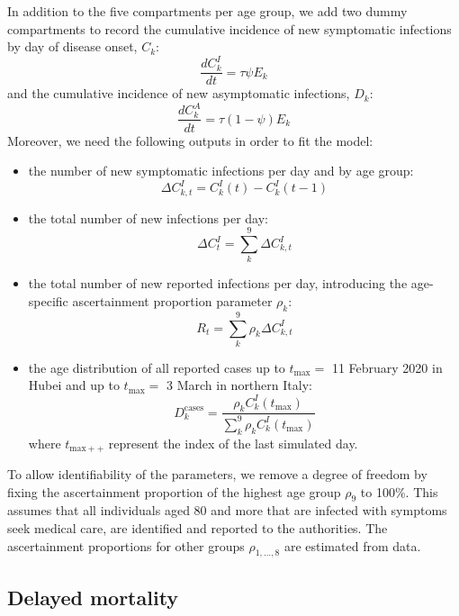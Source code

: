 \documentclass{article}
\begin{document}
	In addition to the five compartments per age group, we add two dummy compartments to record the cumulative incidence of new symptomatic infections by day of disease onset, $C_k$:
	\begin{equation}
	\frac{dC^I_k}{dt} = \tau \psi E_k
	\end{equation}
	and the cumulative incidence of new asymptomatic infections, $D_k$:
	\begin{equation}
	\frac{dC^A_k}{dt} = \tau (1- \psi) E_k
	\end{equation}
	Moreover, we need the following outputs in order to fit the model:
	\begin{itemize}
	\item the number of new symptomatic infections per day and by age group:
	\begin{equation}
	\Delta C_{k,t}^{I} =  C^I_k(t) - C^I_k(t-1) 
	\end{equation}
	\item the total number of new infections per day:
	\begin{equation}
	\Delta	C_t^{I} = \sum_k^9 \Delta C_{k,t}^{I}
	\end{equation}	

	\item the total number of new reported infections per day, introducing the age-specific ascertainment proportion parameter $\rho_k$:
	\begin{equation}
		R_t = \sum_k^9 \rho_k \Delta C_{k,t}^{I}
	\end{equation}	
	\item the age distribution of all reported cases up to $t_{\text{max}}=$ 11 February 2020 in Hubei and up to $t_{\text{max}}=$ 3 March in northern Italy:
	\begin{equation}
		D_k^{\text{cases}} =  \frac{\rho_k C^I_k(t_{\text{max}})}{\sum_k^9 \rho_k C^I_k(t_{\text{max}})}
	\end{equation}
	where $t_{\text{max}++}$ represent the index of the last simulated day.
	\end{itemize}

To allow identifiability of the parameters, we remove a degree of freedom by fixing the ascertainment proportion of the highest age group $\rho_9$ to 100\%. 
This assumes that all individuals aged 80 and more that are infected with symptoms seek medical care, are identified and reported to the authorities. 
The ascertainment proportions for other groups $\rho_{1,\ldots,8}$ are estimated from data.

\subsection{Delayed mortality}
\end{document}
